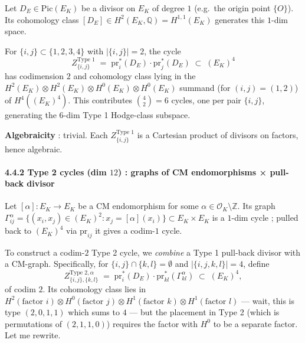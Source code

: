 \documentclass[
  11pt,
  a4paper,
]{amsart}
\begin{document}
Let \(D_E \in \mathrm{Pic}(E_K)\) be a divisor on \(E_K\) of degree \(1\) (e.g.~the origin point \(\{O\}\)). Its cohomology class \([D_E] \in H^2(E_K, \mathbb{Q}) = H^{1,1}(E_K)\) generates this \(1\)-dim space.

For \(\{i, j\} \subset \{1, 2, 3, 4\}\) with \(|\{i, j\}| = 2\), the cycle
\[
Z_{\{i,j\}}^{\text{Type 1}} \;=\; \mathrm{pr}_i^*(D_E) \cdot \mathrm{pr}_j^*(D_E) \;\subset\; (E_K)^4
\]
has codimension \(2\) and cohomology class lying in the \(H^2(E_K) \otimes H^2(E_K) \otimes H^0(E_K) \otimes H^0(E_K)\) summand (for \((i, j) = (1, 2)\)) of \(H^4((E_K)^4)\). This contributes \(\binom{4}{2} = 6\) cycles, one per pair \(\{i, j\}\), generating the \(6\)-dim Type 1 Hodge-class subspace.

\textbf{Algebraicity} : trivial. Each \(Z_{\{i,j\}}^{\text{Type 1}}\) is a Cartesian product of divisors on factors, hence algebraic.

\hypertarget{type-2-cycles-dim-12-graphs-of-cm-endomorphisms-pull-back-divisor}{%
\paragraph{\texorpdfstring{4.4.2 Type 2 cycles (dim \(12\)) : graphs of CM endomorphisms × pull-back divisor}{4.4.2 Type 2 cycles (dim 12) : graphs of CM endomorphisms × pull-back divisor}}\label{type-2-cycles-dim-12-graphs-of-cm-endomorphisms-pull-back-divisor}}

Let \([\alpha] : E_K \to E_K\) be a CM endomorphism for some \(\alpha \in \mathcal{O}_K \setminus \mathbb{Z}\). Its graph \(\Gamma_{ij}^\alpha = \{(x_i, x_j) \in (E_K)^2 : x_j = [\alpha](x_i)\} \subset E_K \times E_K\) is a \(1\)-dim cycle ; pulled back to \((E_K)^4\) via \(\mathrm{pr}_{ij}\) it gives a codim-\(1\) cycle.

To construct a codim-\(2\) Type 2 cycle, we \emph{combine} a Type 1 pull-back divisor with a CM-graph. Specifically, for \(\{i, j\} \cap \{k, l\} = \emptyset\) and \(|\{i, j, k, l\}| = 4\), define
\[
Z_{\{i,j\},\{k,l\}}^{\text{Type 2}, \alpha} \;=\; \mathrm{pr}_i^*(D_E) \cdot \mathrm{pr}_{kl}^*(\Gamma_{kl}^\alpha) \;\subset\; (E_K)^4,
\]
of codim \(2\). Its cohomology class lies in \(H^2(\text{factor }i) \otimes H^0(\text{factor }j) \otimes H^1(\text{factor }k) \otimes H^1(\text{factor }l)\) --- wait, this is type \((2, 0, 1, 1)\) which sums to \(4\) --- but the placement in Type 2 (which is permutations of \((2, 1, 1, 0)\)) requires the factor with \(H^0\) to be a separate factor. Let me rewrite.
\end{document}
